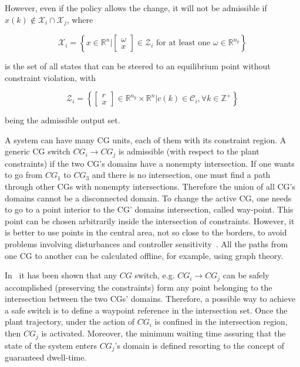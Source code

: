 

However, even if the policy allows the change, it will not be admissible if
\(x(k)\not\in\mathcal{X}_i\cap{}\mathcal{X}_j\), where

\begin{equation}
	\mathcal{X}_i =
	\left\{
	x\in\mathbb{R}^n | \begin{bmatrix}\omega\\x\end{bmatrix} \in
	\mathcal{Z}_i \textrm{ for at least one } \omega\in\mathbb{R}^{n_y}
	\right\}
\end{equation}

is the set of all states that can be steered to an equilibrium point without
constraint violation, with

\begin{equation}
	\mathcal{Z}_i =
	\left\{
	\begin{bmatrix}r\\x\end{bmatrix}
	\in\mathbb{R}^{n_y}\times\mathbb{R}^{n} | c(k)\in\mathcal{C}_i,
	\forall{}k\in\mathbb{Z}^+
	\right\}
\end{equation}

being the admissible output set.

A system can have many CG units, each of them with its constraint region.  A
generic CG switch \(CG_i\rightarrow{}CG_j\) is admissible (with respect to the plant
constraints) if the two CG's domains have a nonempty intersection. If one wants
to go from \(CG_1\) to \(CG_3\) and there is no intersection, one must find a
path through other CGs with nonempty intersections. Therefore the union of all
CG's domains cannot be a disconnected domain. To change the active CG, one needs
to go to a point interior to the CG' domains intersection, called way-point.
This point can be chosen arbitrarily inside the intersection of constraints.
However, it is better to use points in the central area, not so close to the
borders, to avoid problems involving disturbances and controller
sensitivity~\parencite{keel.bhattacharyya:robust}. All the paths from one CG to
another can be calculated offline, for example, using graph
theory\parencite{ahuja.mehlhorn.ea:faster,pettie:new}.

In~\parencite{franzè.lucia.ea:command,lucia.franzè:stabilization} it has been
shown that any \(CG\) switch, e.g.  \(CG_i\rightarrow{}CG_j\) can be safely accomplished
(preserving the constraints) form any point belonging to the intersection
between the two CGs' domains. Therefore, a possible way to achieve a safe switch
is to define a waypoint reference in the intersection set. Once the plant
trajectory, under the action of \(CG_i\) is confined in the intersection region,
then \(CG_j\) is activated. Moreover, the minimum waiting time assuring that the
state of the system enters \(CG_j\)'s domain is defined resorting to the concept
of guaranteed dwell-time.


